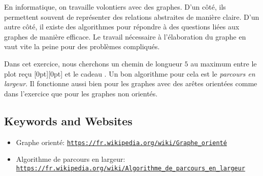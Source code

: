 \documentclass[a4paper,11pt]{report}
\newcommand{\BrochureUrlText}[1]{\texttt{#1}}
\newcommand{\taskGraphicsFolder}{..}
\begin{document}
En informatique, on travaille volontiers avec des graphes. D’un côté, ils permettent souvent de représenter des relations abstraites de manière claire. D’un autre côté, il existe des algorithmes pour répondre à des questions liées aux graphes de manière efficace. Le travail nécessaire à l’élaboration du graphe en vaut vite la peine pour des problèmes compliqués.

Dans cet exercice, nous cherchons un chemin de longueur $5$ au maximum entre le plot reçu \raisebox{\dimexpr -0.5ex +0.3ex \relax}[0pt][0pt]{} et le cadeau \raisebox{\dimexpr -0.5ex +0.3ex \relax}{}. Un bon algorithme pour cela est le \emph{parcours en largeur}. Il fonctionne aussi bien pour les graphes avec des arêtes orientées comme dans l’exercice que pour les graphes non orientés.

{\raggedright

\subsection*{Keywords and Websites}

\begin{itemize}
  \item Graphe orienté: \href{https://fr.wikipedia.org/wiki/Graphe_orient\%C3\%A9}{\BrochureUrlText{https://fr.wikipedia.org/wiki/Graphe\_orienté}}
  \item Algorithme de parcours en largeur: \href{https://fr.wikipedia.org/wiki/Algorithme_de_parcours_en_largeur}{\BrochureUrlText{https://fr.wikipedia.org/wiki/Algorithme\_de\_parcours\_en\_largeur}}
\end{itemize}


}
\end{document}
